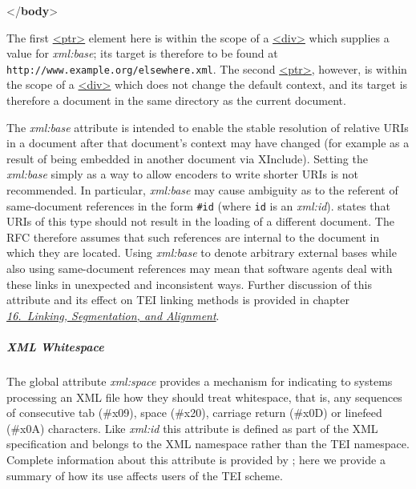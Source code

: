 \begin{shaded}
\mbox{}\newline 
{</\textbf{body}>}\end{shaded}\egroup\par \noindent The first \hyperref[TEI.ptr]{<ptr>} element here is within the scope of a \hyperref[TEI.div]{<div>} which supplies a value for {\itshape xml:base}; its target is therefore to be found at \texttt{http://www.example.org/elsewhere.xml}. The second \hyperref[TEI.ptr]{<ptr>}, however, is within the scope of a \hyperref[TEI.div]{<div>} which does not change the default context, and its target is therefore a document in the same directory as the current document.\par
The {\itshape xml:base} attribute is intended to enable the stable resolution of relative URIs in a document after that document's context may have changed (for example as a result of being embedded in another document via XInclude). Setting the {\itshape xml:base} simply as a way to allow encoders to write shorter URIs is not recommended. In particular, {\itshape xml:base} may cause ambiguity as to the referent of same-document references in the form \texttt{\#id} (where \texttt{id} is an {\itshape xml:id}).  states that URIs of this type should not result in the loading of a different document. The RFC therefore assumes that such references are internal to the document in which they are located. Using {\itshape xml:base} to denote arbitrary external bases while also using same-document references may mean that software agents deal with these links in unexpected and inconsistent ways. Further discussion of this attribute and its effect on TEI linking methods is provided in chapter \textit{\hyperref[SA]{16.\ Linking, Segmentation, and Alignment}}.
\subparagraph[{XML Whitespace}]{XML Whitespace}\label{STGAxs}\par
The global attribute {\itshape xml:space} provides a mechanism for indicating to systems processing an XML file how they should treat whitespace, that is, any sequences of consecutive tab (\#x09), space (\#x20), carriage return (\#x0D) or linefeed (\#x0A) characters. Like {\itshape xml:id} this attribute is defined as part of the XML specification and belongs to the XML namespace rather than the TEI namespace. Complete information about this attribute is provided by ; here we provide a summary of how its use affects users of the TEI scheme.\par
